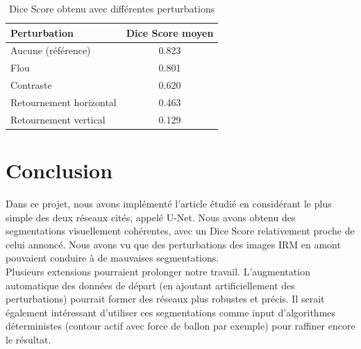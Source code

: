 \documentclass{article}
\begin{document}
\begin{table}[!h]
\centering
\begin{tabular}{|l||c|}
\hline
Perturbation & Dice Score moyen\\\hline
Aucune (référence) & 0.823 \\
Flou & 0.801 \\
Contraste & 0.620 \\
Retournement horizontal & 0.463 \\
Retournement vertical & 0.129  \\

\hline
\end{tabular}
\caption{\label{tab:augm} Dice Score obtenu avec différentes perturbations}
\end{table}



\section{Conclusion}

Dans ce projet, nous avons implémenté l'article étudié \cite{learningcontour} en considérant le plus simple des deux réseaux cités, appelé U-Net. Nous avons obtenu des segmentations visuellement cohérentes, avec un Dice Score relativement proche de celui annoncé. Nous avons vu que des perturbations des images IRM en amont pouvaient conduire à de mauvaises segmentations. \\

Plusieurs extensions pourraient prolonger notre travail. L'augmentation automatique des données de départ (en ajoutant artificiellement des perturbations) pourrait former des réseaux plus robustes et précis. Il serait également intéressant d'utiliser ces segmentations comme input d'algorithmes déterministes (contour actif avec force de ballon par exemple) pour raffiner encore le résultat.
\end{document}
